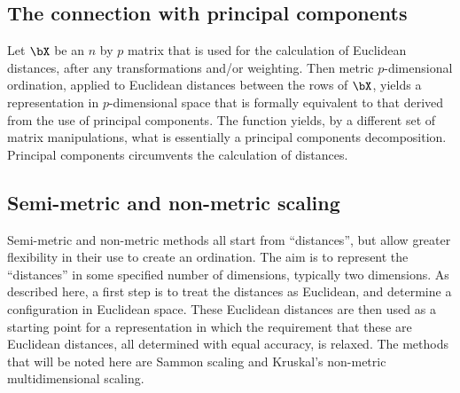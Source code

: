 \subsection*{The connection with principal components}
Let $\bX$ be an $n$ by $p$ matrix that is used for the calculation of
Euclidean distances, after any transformations and/or weighting.
Then metric $p$-dimensional ordination, applied to Euclidean distances
between the rows of $\bX$, yields a representation in $p$-dimensional
space that is formally equivalent to that derived from the use of
principal components.  The function  yields, by a
different set of matrix manipulations, what is essentially a principal
components decomposition.  Principal components circumvents the
calculation of distances.

\subsection*{Semi-metric and non-metric scaling}

Semi-metric and non-metric methods all start from ``distances'', but
allow greater flexibility in their use to create an ordination. The
aim is to represent the ``distances'' in some specified number of
dimensions, typically two dimensions.  As described here, a first step
is to treat the distances as Euclidean, and determine a configuration
in Euclidean space.  These Euclidean distances are then used as a
starting point for a representation in which the requirement that
these are Euclidean distances, all determined with equal accuracy, is
relaxed.  The methods that will be noted here are Sammon scaling and
Kruskal's non-metric multidimensional scaling.


